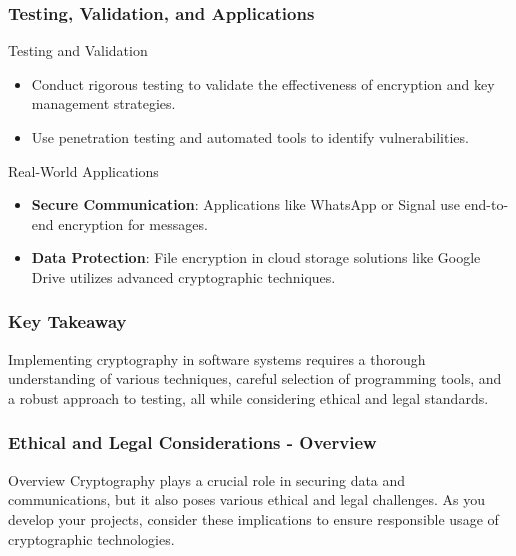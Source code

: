 \documentclass{beamer}
\begin{document}
\begin{frame}[fragile]
    \frametitle{Testing, Validation, and Applications}
    \begin{block}{Testing and Validation}
        \begin{itemize}
            \item Conduct rigorous testing to validate the effectiveness of encryption and key management strategies.
            \item Use penetration testing and automated tools to identify vulnerabilities.
        \end{itemize}
    \end{block}
    \begin{block}{Real-World Applications}
        \begin{itemize}
            \item \textbf{Secure Communication}: Applications like WhatsApp or Signal use end-to-end encryption for messages.
            \item \textbf{Data Protection}: File encryption in cloud storage solutions like Google Drive utilizes advanced cryptographic techniques.
        \end{itemize}
    \end{block}
\end{frame}

\begin{frame}[fragile]
    \frametitle{Key Takeaway}
    Implementing cryptography in software systems requires a thorough understanding of various techniques, careful selection of programming tools, and a robust approach to testing, all while considering ethical and legal standards.
\end{frame}

\begin{frame}[fragile]
    \frametitle{Ethical and Legal Considerations - Overview}
    \begin{block}{Overview}
        Cryptography plays a crucial role in securing data and communications, 
        but it also poses various ethical and legal challenges. 
        As you develop your projects, consider these implications to ensure responsible usage of cryptographic technologies.
    \end{block}
\end{frame}
\end{document}
